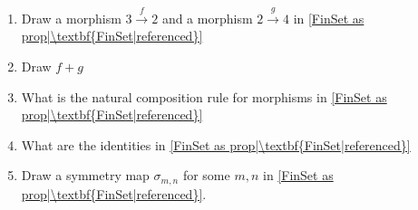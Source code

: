 
\begin{enumerate}
    \item Draw a morphism $3 \xrightarrow f 2$ and a morphism $2 \xrightarrow g 4$ in \ref{FinSet as prop|\textbf{FinSet|referenced}}
    \item Draw $f+g$
    \item What is the natural composition rule for morphisms in \ref{FinSet as prop|\textbf{FinSet|referenced}}
    \item What are the identities in \ref{FinSet as prop|\textbf{FinSet|referenced}}
    \item Draw a symmetry map $\sigma_{m,n}$ for some $m,n$ in \ref{FinSet as prop|\textbf{FinSet|referenced}}.
  \end{enumerate}